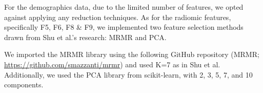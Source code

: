 For the demographics data, due to the limited number of features, we opted against applying any reduction techniques. As for the radiomic features, specifically 
F5, F6, F8 \& F9, we implemented two feature selection methods drawn from Shu et al.'s research: MRMR \cite{Ding_Peng} and PCA. 

We imported the MRMR library using the following GitHub repository (MRMR; \url{https://github.com/smazzanti/mrmr}) and used K=7 as in Shu et al. 
Additionally, we used the PCA library from scikit-learn, with 2, 3, 5, 7, and 10 components.